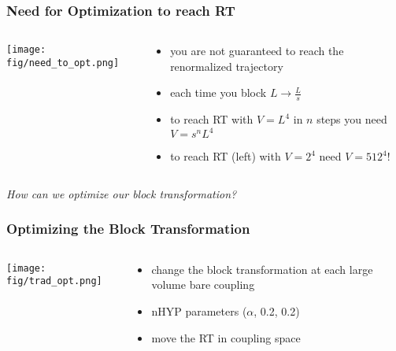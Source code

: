 \begin{frame}
  \frametitle{Need for Optimization to reach RT}
  \begin{columns}[T]
    \begin{column}{.5\textwidth}
      \begin{block}{}
        \texttt{[image: fig/need\_to\_opt.png]}
      \end{block}
    \end{column}
    \begin{column}{.5\textwidth}
      \begin{block}{}
        \begin{itemize}
          \item you are not guaranteed to reach the renormalized trajectory
          \item each time you block $L\rightarrow\frac{L}{s}$
          \item to reach RT with $V=L^4$ in $n$ steps you need $V=s^nL^{4}$
          \item to reach RT (left) with $V=2^4$ need $V=512^4$!
        \end{itemize}
      \end{block}
    \end{column}
  \end{columns}
\begin{center}\emph{How can we optimize our block transformation?}\end{center}
\end{frame}

\begin{frame}
  \frametitle{Optimizing the Block Transformation}
  \begin{columns}[T]
    \begin{column}{.5\textwidth}
      \begin{block}{}
        \texttt{[image: fig/trad\_opt.png]}
      \end{block}
    \end{column}
    \begin{column}{.5\textwidth}
      \begin{block}{}
        \begin{itemize}
          \item change the block transformation at each large volume bare coupling
          \item nHYP parameters ($\alpha$, 0.2, 0.2)
          \item move the RT in coupling space
        \end{itemize}
      \end{block}
    \end{column}
  \end{columns}

\end{frame}

